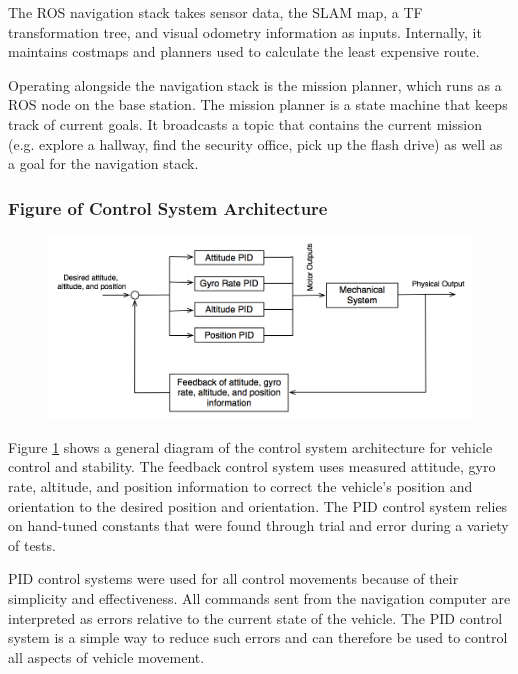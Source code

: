 \documentclass[12pt, letterpaper]{article}
\begin{document}
The ROS navigation stack takes sensor data, the SLAM map, a TF transformation tree, and visual odometry information as inputs.  Internally, it maintains costmaps and planners used to calculate the least expensive route.  

Operating alongside the navigation stack is the mission planner, which runs as a ROS node on the base station.  The mission planner is a state machine that keeps track of current goals.  It broadcasts a topic that contains the current mission (e.g. explore a hallway, find the security office, pick up the flash drive) as well as a goal for the navigation stack.

\subsubsection{Figure of Control System Architecture}

\begin{figure}[h]
\centering
\includegraphics[width=14cm]{images/Control-System-Diagram.png}
\label{fig:controlsystem}
\end{figure}

Figure \ref{fig:controlsystem} shows a general diagram of the control system architecture for vehicle control and stability. The feedback control system uses measured attitude, gyro rate, altitude, and position information to correct the vehicle's position and orientation to the desired position and orientation. The PID control system relies on hand-tuned constants that were found through trial and error during a variety of tests. 

PID control systems were used for all control movements because of their simplicity and effectiveness. All commands sent from the navigation computer are interpreted as errors relative to the current state of the vehicle. The PID control system is a simple way to reduce such errors and can therefore be used to control all aspects of vehicle movement.
\end{document}
